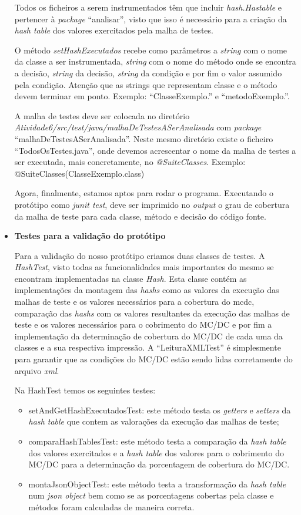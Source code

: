 \documentclass[a4paper,11pt]{article}
\newcommand{\sepitem}{\vspace{0.1in}\item}
\begin{document}
\begin{itemize}
Todos os ficheiros a serem instrumentados têm que incluir \textit{hash.Hastable} e pertencer à \textit{package} 
``analisar'', visto que isso é necessário para a criação da \textit{hash table} dos valores exercitados pela malha de 
testes.

O método \textit{setHashExecutados} recebe como parâmetros a \textit{string} com o nome da classe a ser instrumentada, 
\textit{string} com o nome do método onde se encontra a decisão, \textit{string} da decisão, \textit{string} da condição 
e por fim o valor assumido pela condição. Atenção que as strings que representam classe e o método devem terminar em ponto. 
Exemplo: ``ClasseExemplo.'' e ``metodoExemplo.''.

A malha de testes deve ser colocada no diretório \textit{Atividade6/src/test/java/malhaDeTestesASerAnalisada} com 
\textit{package} ``malhaDeTestesASerAnalisada''. Neste mesmo diretório existe o ficheiro ``TodosOsTestes.java'', onde devemos
acrescentar o nome da malha de testes a ser executada, mais concretamente, no \textit{@SuiteClasses}. Exemplo: 
@SuiteClasses({ClasseExemplo.class})

Agora, finalmente, estamos aptos para rodar o programa. Executando o protótipo como \textit{junit test}, deve ser imprimido 
no \textit{output} o grau de cobertura da malha de teste para cada classe, método e decisão do código fonte.   

\sepitem \textbf{Testes para a validação do protótipo}
\setlength{\parindent}{5ex}

Para a validação do nosso protótipo criamos duas classes de testes. A \textit{HashTest}, visto todas as funcionalidades 
mais importantes do mesmo se encontram implementadas na classe \textit{Hash}. Esta classe contém as implementações da 
montagem das \textit{hashs} como as valores da execução das malhas de teste e os valores necessários para a cobertura do
mcdc, comparação das \textit{hashs} com os valores resultantes da execução das malhas de teste e os valores necessários 
para o cobrimento do MC/DC e por fim a implementação da determinação de cobertura do MC/DC de cada uma da classes
e a sua respectiva impressão. A ``LeituraXMLTest'' é simplesmente para garantir que as condições do MC/DC estão sendo
lidas corretamente do arquivo \textit{xml}.

Na HashTest temos os seguintes testes:
\begin{itemize}
\item setAndGetHashExecutadosTest: este método testa os \textit{getters} e \textit{setters} da \textit{hash table} que contem as 
valorações da execução das malhas de teste;
\item comparaHashTablesTest: este método testa a comparação da \textit{hash table} dos valores exercitados e a \textit{hash table} dos
valores para o cobrimento do MC/DC para a determinação da porcentagem de cobertura do MC/DC. 
\item montaJsonObjectTest: este método testa a transformação da \textit{hash table} num \textit{json object} bem como se as porcentagens 
cobertas pela classe e métodos foram calculadas de maneira correta. 
\end{itemize}


\end{itemize}
\end{document}
